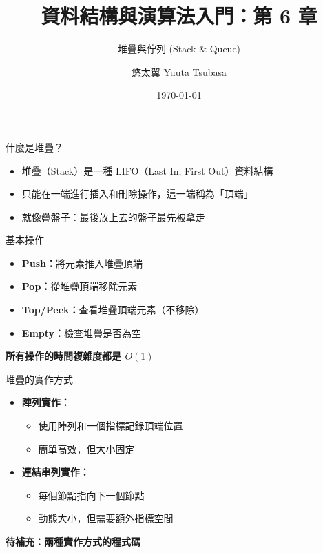 \documentclass{beamer}
\begin{document}
\title{資料結構與演算法入門：第 6 章}
\subtitle{堆疊與佇列 (Stack \& Queue)}
\author{悠太翼 Yuuta Tsubasa}
\date{\today}

\frame{\titlepage}

\begin{frame}{什麼是堆疊？}
\begin{itemize}
    \item 堆疊（Stack）是一種 LIFO（Last In, First Out）資料結構
    \item 只能在一端進行插入和刪除操作，這一端稱為「頂端」
    \item 就像疊盤子：最後放上去的盤子最先被拿走
\end{itemize}

\vspace{1em}
\begin{block}{基本操作}
\begin{itemize}
    \item \textbf{Push：}將元素推入堆疊頂端
    \item \textbf{Pop：}從堆疊頂端移除元素
    \item \textbf{Top/Peek：}查看堆疊頂端元素（不移除）
    \item \textbf{Empty：}檢查堆疊是否為空
\end{itemize}
\end{block}

\vspace{1em}
\begin{center}
\textbf{所有操作的時間複雜度都是 $O(1)$}
\end{center}
\end{frame}

\begin{frame}{堆疊的實作方式}
\begin{itemize}
    \item \textbf{陣列實作：}
    \begin{itemize}
        \item 使用陣列和一個指標記錄頂端位置
        \item 簡單高效，但大小固定
    \end{itemize}
    \item \textbf{連結串列實作：}
    \begin{itemize}
        \item 每個節點指向下一個節點
        \item 動態大小，但需要額外指標空間
    \end{itemize}
\end{itemize}

\vspace{1em}
\textbf{待補充：兩種實作方式的程式碼}
\end{frame}
\end{document}
